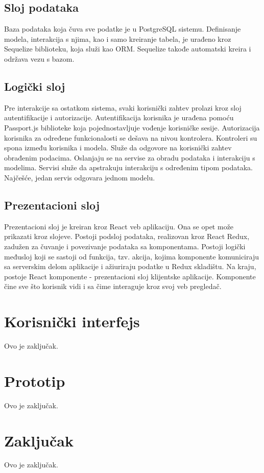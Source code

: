 \documentclass[a4paper]{article}
\begin{document}
\subsection{Sloj podataka}
Baza podataka koja čuva sve podatke je u PostgreSQL sistemu. Definisanje modela, interakcija s njima, kao i samo kreiranje tabela, je urađeno kroz Sequelize biblioteku, koja služi kao ORM. Sequelize takođe automatski kreira i održava vezu s bazom. 

\subsection{Logički sloj}
Pre interakcije sa ostatkom sistema, svaki korisnički zahtev prolazi kroz sloj autentifikacije i autorizacije. Autentifikacija korisnika je urađena pomoću Passport.js biblioteke koja pojednostavljuje vođenje korisničke sesije. Autorizacija korisnika za određene funkcionalosti se dešava na nivou kontrolera. 
Kontroleri su spona između korisnika i modela. Služe da odgovore na korisnički zahtev obrađenim podacima. Oslanjaju se na servise za obradu podataka i interakciju s modelima. 
Servisi služe da apstrakuju interakciju s određenim tipom podataka. Najčešće, jedan servis odgovara jednom modelu. 

\subsection{Prezentacioni sloj}
Prezentacioni sloj je kreiran kroz React veb aplikaciju. Ona se opet može prikazati kroz slojeve. Postoji podsloj podataka, realizovan kroz React Redux, zadužen za čuvanje i povezivanje podataka sa komponentama. Postoji logički međusloj koji se sastoji od funkcija, tzv. akcija, kojima komponente komuniciraju sa serverskim delom aplikacije i ažiuriraju podatke u Redux skladištu. Na kraju, postoje React komponente -  prezentacioni sloj klijentske aplikacije. Komponente čine sve što korisnik vidi i sa čime interaguje kroz svoj veb pregledač.


\section{Korisnički interfejs}
Ovo je zaključak.

\section{Prototip}
Ovo je zaključak.

\section{Zaključak}
Ovo je zaključak.

\newpage

\appendix
 

\end{document}
